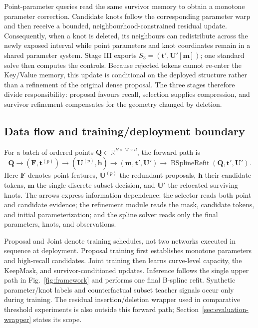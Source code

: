\documentclass[preprint,12pt]{elsarticle}
\begin{document}
Point-parameter queries read the same survivor memory to obtain a monotone
parameter correction. Candidate knots follow the corresponding parameter
warp and then receive a bounded, neighbourhood-constrained residual update.
Consequently, when a knot is deleted, its neighbours can redistribute across
the newly exposed interval while point parameters and knot coordinates remain
in a shared parameter system. Stage III exports
$S_3=(\bm t',\bm U'[\bm m])$; one standard solve then computes the controls.
Because rejected tokens cannot re-enter the Key/Value memory, this update is
conditional on the deployed structure rather than a refinement of the
original dense proposal. The three stages therefore divide responsibility:
proposal favours recall, selection supplies compression, and survivor
refinement compensates for the geometry changed by deletion.

\subsection{Data flow and training/deployment boundary}
For a batch of ordered points $\bm Q\in\mathbb R^{B\times M\times d}$, the
forward path is
\begin{equation}
\bm Q\rightarrow(\bm F,\bm t^{(p)})\rightarrow
(\bm U^{(p)},\bm h)\rightarrow
(\bm m,\bm t',\bm U')\rightarrow
\operatorname{BSplineRefit}(\bm Q,\bm t',\bm U').
\label{eq:pipeline}
\end{equation}
Here $\bm F$ denotes point features, $\bm U^{(p)}$ the redundant proposals,
$\bm h$ their candidate tokens, $\bm m$ the single discrete subset decision,
and $\bm U'$ the relocated surviving knots. The arrows express information
dependence: the selector reads both point and candidate evidence; the
refinement module reads the mask, candidate tokens, and initial
parameterization; and the spline solver reads only the final parameters,
knots, and observations.

Proposal and Joint denote training schedules, not two networks executed in
sequence at deployment. Proposal training first establishes monotone
parameters and high-recall candidates. Joint training then learns curve-level
capacity, the KeepMask, and survivor-conditioned updates. Inference follows
the single upper path in Fig.~\ref{fig:framework} and performs one final
B-spline refit. Synthetic parameter/knot labels and counterfactual subset
teacher signals occur only during training. The residual insertion/deletion
wrapper used in comparative threshold experiments is also outside this
forward path; Section~\ref{sec:evaluation-wrapper} states its scope.
\end{document}
